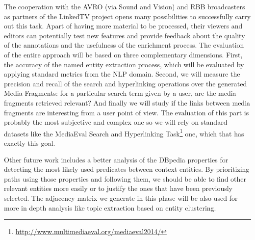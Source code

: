 \documentclass[a4paper,11pt]{report}
\begin{document}
The cooperation with the AVRO (via Sound and Vision) and RBB broadcasters as partners of the LinkedTV project opens many possibilities to successfully carry out this task. Apart of having more material to be processed, their viewers and editors can potentially test new features and provide feedback about the quality of the annotations and the usefulness of the enrichment process. The evaluation of the entire approach will be based on three complementary dimensions. First, the accuracy of the named entity extraction process, which will be evaluated by applying standard metrics from the NLP domain. Second, we will measure the precision and recall of the search and hyperlinking operations over the generated Media Fragments: for a particular search term given by a user, are the media fragments retrieved relevant? And finally we will study if the links between media fragments are interesting from a user point of view. The evaluation of this part is probably the most subjective and complex one so we will rely on standard datasets like the MediaEval Search and Hyperlinking Task\footnote{\url{http://www.multimediaeval.org/mediaeval2014/}} one, which that has exactly this goal.

Other future work includes a better analysis of the DBpedia properties for detecting the most likely used predicates between context entities. By prioritizing paths using those properties and following them, we should be able to find other relevant entities more easily or to justify the ones that have been previously selected. The adjacency matrix we generate in this phase will be also used for more in depth analysis like topic extraction based on entity clustering.

%
\end{document}
